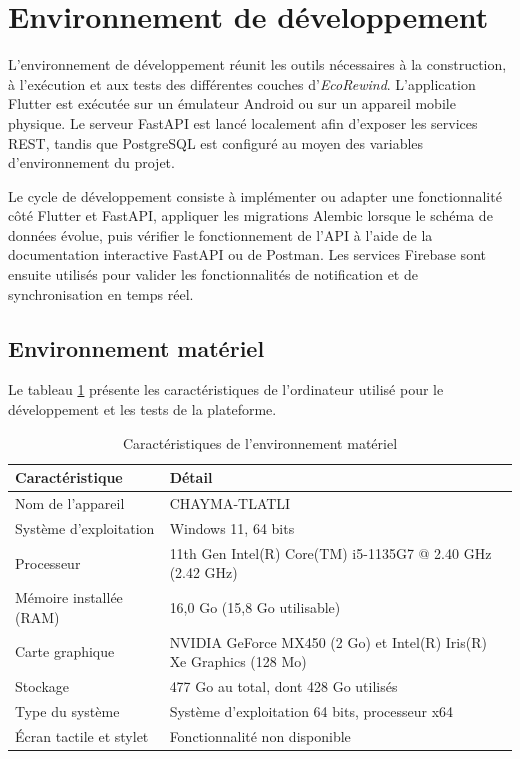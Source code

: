 \section{Environnement de développement}
\label{sec:environnement_developpement}

L'environnement de développement réunit les outils nécessaires à la construction, à l'exécution et aux tests des différentes couches d'\textit{EcoRewind}. L'application Flutter est exécutée sur un émulateur Android ou sur un appareil mobile physique. Le serveur FastAPI est lancé localement afin d'exposer les services REST, tandis que PostgreSQL est configuré au moyen des variables d'environnement du projet.

Le cycle de développement consiste à implémenter ou adapter une fonctionnalité côté Flutter et FastAPI, appliquer les migrations Alembic lorsque le schéma de données évolue, puis vérifier le fonctionnement de l'API à l'aide de la documentation interactive FastAPI ou de Postman. Les services Firebase sont ensuite utilisés pour valider les fonctionnalités de notification et de synchronisation en temps réel.

\subsection{Environnement matériel}

Le tableau \ref{tab:environnement_materiel} présente les caractéristiques de l'ordinateur utilisé pour le développement et les tests de la plateforme.

\begin{table}[H]
\centering
\renewcommand{\arraystretch}{1.25}
\begin{tabular}{|p{5cm}|p{8cm}|}
\hline
\textbf{Caractéristique} & \textbf{Détail} \\
\hline
Nom de l'appareil & CHAYMA-TLATLI \\
\hline
Système d'exploitation & Windows 11, 64 bits \\
\hline
Processeur & 11th Gen Intel(R) Core(TM) i5-1135G7 @ 2.40 GHz (2.42 GHz) \\
\hline
Mémoire installée (RAM) & 16,0 Go (15,8 Go utilisable) \\
\hline
Carte graphique & NVIDIA GeForce MX450 (2 Go) et Intel(R) Iris(R) Xe Graphics (128 Mo) \\
\hline
Stockage & 477 Go au total, dont 428 Go utilisés \\
\hline
Type du système & Système d'exploitation 64 bits, processeur x64 \\
\hline
Écran tactile et stylet & Fonctionnalité non disponible \\
\hline
\end{tabular}
\caption{Caractéristiques de l'environnement matériel}
\label{tab:environnement_materiel}
\end{table}

